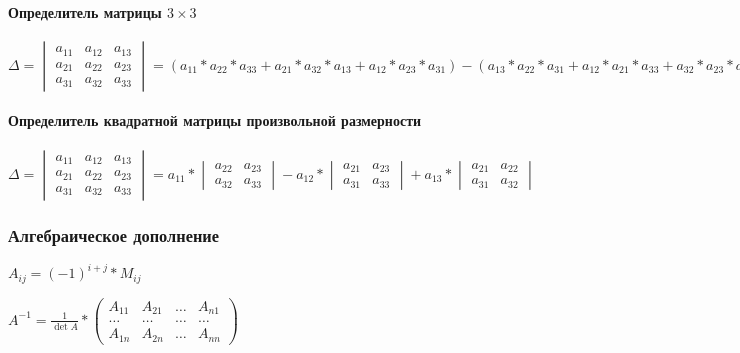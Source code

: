 \documentclass{article}
\begin{document}
\begin{flushleft}
\paragraph{Определитель матрицы $3 \times 3$}

\hfill

\hspace{5mm} $\Delta = \begin{vmatrix}
    a_{11} & a_{12} & a_{13} \\
    a_{21} & a_{22} & a_{23} \\
    a_{31} & a_{32} & a_{33}
\end{vmatrix} = (a_{11} * a_{22} * a_{33} + a_{21} * a_{32} * a_{13} + a_{12} * a_{23} * a_{31}) - (a_{13} * a_{22} * a_{31} + a_{12} * a_{21} * a_{33} + a_{32} * a_{23} * a_{11})$

\paragraph{Определитель квадратной матрицы произвольной размерности}

\hfill

\hspace{5mm} $\Delta = \begin{vmatrix}
    a_{11} & a_{12} & a_{13} \\
    a_{21} & a_{22} & a_{23} \\
    a_{31} & a_{32} & a_{33}
\end{vmatrix} = a_{11} * \begin{vmatrix}
    a_{22} & a_{23} \\
    a_{32} & a_{33}
\end{vmatrix} - a_{12} * \begin{vmatrix}
    a_{21} & a_{23} \\
    a_{31} & a_{33}
\end{vmatrix} + a_{13} * \begin{vmatrix}
    a_{21} & a_{22} \\
    a_{31} & a_{32}
\end{vmatrix}$

\subsubsection{Алгебраическое дополнение}

$A_{ij} = (-1)^{i + j} * M_{ij}$

$A^{-1} = \frac{1}{\det A} * \begin{pmatrix}
    A_{11} & A_{21} & \dots & A_{n 1} \\
    \dots & \dots & \dots & \dots \\
    A_{1 n} & A_{2n} & \dots & A_{n n}
\end{pmatrix}$


\end{flushleft}
\end{document}
